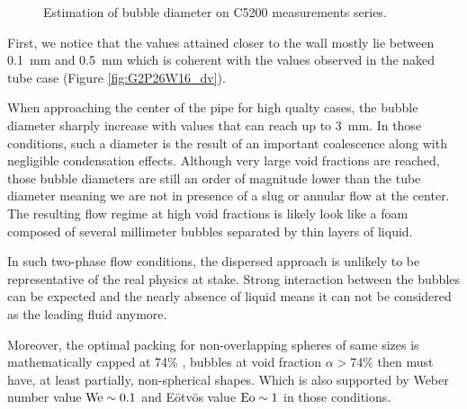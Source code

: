 \begin{figure}[!h]
\centering
{}

\caption{Estimation of bubble diameter on C5200 measurements series.}
\label{fig:exp_C52_dvap}
\end{figure}

\npar

First, we notice that the values attained closer to the wall mostly lie between 0.1\ mm and 0.5\ mm which is coherent with the values observed in the naked tube case (Figure \ref{fig:G2P26W16_dv}).

\npar

When approaching the center of the pipe for high qualty cases, the bubble diameter sharply increase with values that can reach up to 3\ mm. In those conditions, such a diameter is the result of an important coalescence along with negligible condensation effects. Although very large void fractions are reached, those bubble diameters are still an order of magnitude lower than the tube diameter meaning we are not in presence of a slug or annular flow at the center. The resulting flow regime at high void fractions is likely look like a foam composed of several millimeter bubbles separated by thin layers of liquid.

\begin{remark*}{}
In such two-phase flow conditions, the dispersed approach is unlikely to be representative of the real physics at stake. Strong interaction between the bubbles can be expected and the nearly absence of liquid means it can not be considered as the leading fluid anymore.

\npar

Moreover, the optimal packing for non-overlapping spheres of same sizes is mathematically capped at 74\% \cite{wu_bulk_2003}, bubbles at void fraction $\alpha > 74\%$ then must have, at least partially, non-spherical shapes. Which is also supported by Weber number value $\mathrm{We} \sim 0.1$ and E\"otv\"os value $\mathrm{Eo} \sim 1$ in those conditions.
\end{remark*}

